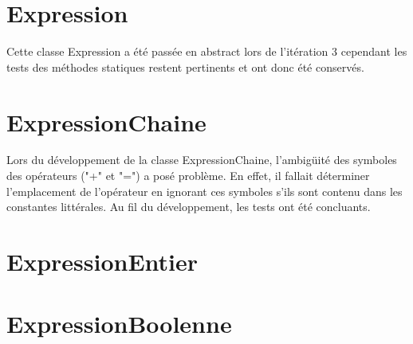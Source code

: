 
\section{Expression}

Cette classe Expression a été passée en abstract lors de l'itération 3
cependant les tests des méthodes statiques restent pertinents et ont donc
été conservés.

\section{ExpressionChaine}

Lors du développement de la classe ExpressionChaine, l'ambigüité des symboles
des opérateurs ("+" et "=") a posé problème. En effet, il fallait déterminer
l'emplacement de l'opérateur en ignorant ces symboles s'ils sont contenu dans
les constantes littérales. Au fil du développement, les tests ont été concluants.

\section{ExpressionEntier}

\section{ExpressionBoolenne}

